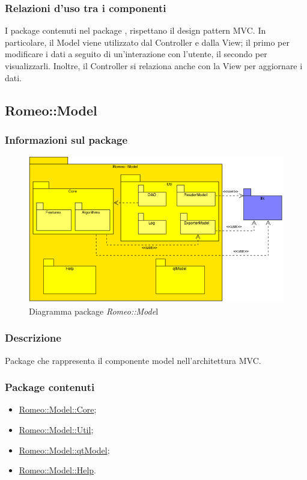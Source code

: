 	\subsubsection{Relazioni d'uso tra i componenti}
	I package\g{} contenuti nel package\g{} \project{}, rispettano il design pattern\g{} MVC\g{}. In particolare, il Model viene utilizzato dal Controller e dalla View; il primo per modificare i dati a seguito di un'interazione con l'utente, il secondo per visualizzarli. Inoltre, il Controller si relaziona anche con la View per aggiornare i dati.
	\pagebreak
	
\subsection{Romeo::Model}
\label{romeo::model}
	\subsubsection{Informazioni sul package}
	\label{info_model}
	\begin{figure}[!h]
		\centering
		\includegraphics[scale=0.7]{./Content/Immagini/Romeo__Model.png}
		\caption{Diagramma package \textsl{Romeo::Mode}l}
		\label{comp_Romo::Model}
	\end{figure}
	\subsubsection{Descrizione}
	\label{info_model_descr}
	Package\glossario{} che rappresenta il componente model nell'architettura MVC\glossario{}.
	\subsubsection{Package contenuti}
	\label{contenuti_model}
	\begin{itemize}
		\item \hyperref[romeo::model::core]{Romeo::Model::Core};
		\item \hyperref[romeo::model::util]{Romeo::Model::Util};
		\item \hyperref[romeo::model::qtmodel]{Romeo::Model::qtModel};
		\item \hyperref[romeo::model::help]{Romeo::Model::Help}.
	\end{itemize}
	
